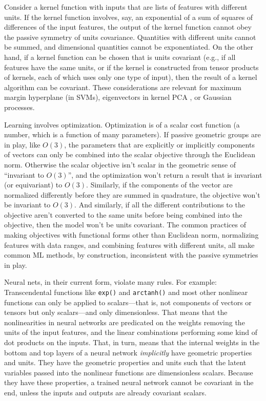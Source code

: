 \documentclass{article}
\theoremstyle{plain}
\theoremstyle{definition}
\theoremstyle{remark}
\begin{document}
Consider a kernel function with inputs that are lists of features with different units.
If the kernel function involves, say, an exponential of a sum of squares of differences of the input features, the output of the kernel function cannot obey the passive symmetry of units covariance.
Quantities with different units cannot be summed, and dimensional quantities cannot be exponentiated. 
On the other hand, if a kernel function can be chosen that is units covariant (e.g., if all features have the same units, or if the kernel is constructed from tensor products of kernels, each of which uses only one type of input), then the result of a kernel algorithm can be covariant. These considerations are relevant for maximum margin hyperplane (in SVMs), eigenvectors in kernel PCA \cite{SchSmo02}, or Gaussian processes.

Learning involves optimization.
Optimization is of a scalar cost function (a number, which is a function of many parameters).
If passive geometric groups are in play, like $O(3)$, the parameters that are explicitly or implicitly components of vectors can only be combined into the scalar objective through the Euclidean norm. Otherwise the scalar objective isn't scalar in the geometric sense of ``invariant to $O(3)$'', and the optimization won't return a result that is invariant (or equivariant) to $O(3)$.
Similarly, if the components of the vector are normalized differently before they are summed in quadrature, the objective won't be invariant to $O(3)$.
And similarly, if all the different contributions to the objective aren't converted to the same units before being combined into the objective, then the model won't be units covariant.
The common practices of making objectives with functional forms other than Euclidean norm, normalizing features with data ranges, and combining features with different units, all make common ML methods, by construction, inconsistent with the passive symmetries in play.

Neural nets, in their current form, violate many rules. For example:
Transcendental functions like \texttt{exp()} and \texttt{arctanh()} and most other nonlinear functions can only be applied to scalars---that is, not components of vectors or tensors but only scalars---and only dimensionless.
That means that the nonlinearities in neural networks are predicated on the weights removing the units of the input features, and the linear combinations performing some kind of dot products on the inputs.
That, in turn, means that the internal weights in the bottom and top layers of a neural network \emph{implicitly} have geometric properties and units.
They have the geometric properties and units such that the latent variables passed into the nonlinear functions are dimensionless scalars.
Because they have these properties, a trained neural network cannot be covariant in the end, unless the inputs and outputs are already covariant scalars.
\end{document}
